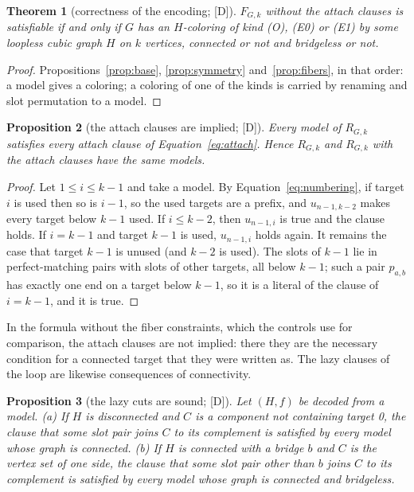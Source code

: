 \documentclass[11pt]{article}
\newtheorem{theorem}{Theorem}[section]
\newtheorem{proposition}[theorem]{Proposition}
\theoremstyle{definition}
\theoremstyle{remark}
\newcommand{\evD}{\textnormal{[D]}}
\begin{document}
\begin{theorem}[correctness of the encoding; \evD]\label{thm:encoding}
$F_{G,k}$ without the attach clauses is satisfiable if and only if $G$ has an $H$-coloring of kind (O), (E0) or (E1) by some loopless cubic graph $H$ on $k$ vertices, connected or not and bridgeless or not.
\end{theorem}

\begin{proof}
Propositions~\ref{prop:base}, \ref{prop:symmetry} and~\ref{prop:fibers}, in that order: a model gives a coloring; a coloring of one of the kinds is carried by renaming and slot permutation to a model.
\end{proof}

\begin{proposition}[the attach clauses are implied; \evD]\label{prop:attach}
Every model of $R_{G,k}$ satisfies every attach clause of Equation~\eqref{eq:attach}. Hence $R_{G,k}$ and $R_{G,k}$ with the attach clauses have the same models.
\end{proposition}

\begin{proof}
Let $1 \le i \le k-1$ and take a model. By Equation~\eqref{eq:numbering}, if target $i$ is used then so is $i-1$, so the used targets are a prefix, and $u_{n-1,k-2}$ makes every target below $k-1$ used. If
$i \le k-2$, then $u_{n-1,i}$ is true and the clause holds. If $i = k-1$ and target $k-1$ is used, $u_{n-1,i}$ holds again. It remains the case that target $k-1$ is unused (and $k-2$ is used). The slots of
$k-1$ lie in perfect-matching pairs with slots of other targets, all below $k-1$; such a pair $p_{a,b}$ has exactly one end on a target below $k-1$, so it is a literal of the clause of $i = k-1$, and it is true.
\end{proof}

In the formula without the fiber constraints, which the controls use for comparison, the attach clauses are not implied: there they are the necessary condition for a connected target that they
were written as. The lazy clauses of the loop are likewise consequences of connectivity.

\begin{proposition}[the lazy cuts are sound; \evD]\label{prop:cuts}
Let $(H,f)$ be decoded from a model. (a) If $H$ is disconnected and $C$ is a component not containing target 0, the clause that some slot pair joins $C$ to its complement is satisfied by every
model whose graph is connected. (b) If $H$ is connected with a bridge $b$ and $C$ is the vertex set of one side, the clause that some slot pair other than $b$ joins $C$ to its complement is satisfied by every model whose graph is connected and bridgeless.
\end{proposition}
\end{document}
